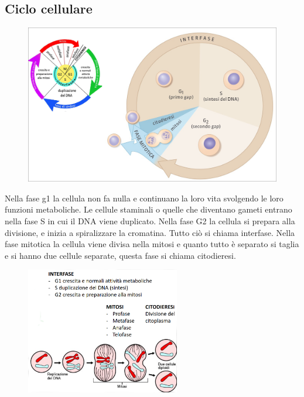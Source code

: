 \documentclass[a4paper]{article}
\begin{document}
\subsection{Ciclo cellulare}

\vspace{0.1cm}

\begin{center}
\begin{figure}[ht]
    \centering
    \includegraphics[width=\textwidth]{./ciclo_cellulare}
\end{figure}
\end{center}

Nella fase g1 la cellula non fa nulla e continuano la loro vita svolgendo le loro funzioni metaboliche. 
Le cellule staminali o quelle che diventano gameti entrano nella fase S in cui il DNA viene duplicato. 
Nella fase G2 la cellula si prepara alla divisione, e inizia a spiralizzare la cromatina. 
Tutto ciò si chiama interfase.
Nella fase mitotica la cellula viene divisa nella mitosi e quanto tutto è separato si taglia e si hanno due cellule separate, questa fase si chiama citodieresi.

\begin{center}
\begin{figure}[ht!]
    \centering
    \includegraphics[width=0.6\textwidth]{./ciclo_cellulare2}
\end{figure}
\end{center}
\end{document}
